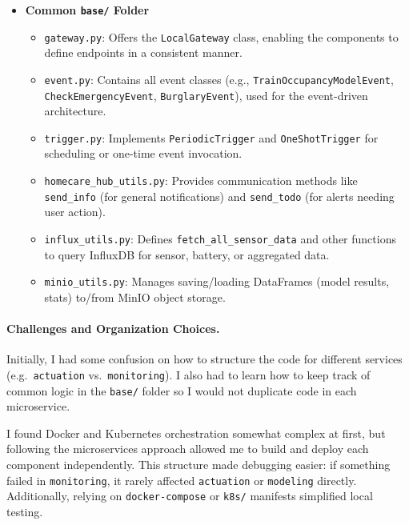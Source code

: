 \documentclass[A4,10pt]{article}
\begin{document}
\begin{itemize}
  \item \textbf{Common \texttt{base/} Folder}
  \begin{itemize}
    \item \texttt{gateway.py}: Offers the \texttt{LocalGateway} class, enabling the components to define 
      endpoints in a consistent manner.
    \item \texttt{event.py}: Contains all event classes (e.g., \texttt{TrainOccupancyModelEvent}, 
      \texttt{CheckEmergencyEvent}, \texttt{BurglaryEvent}), used for the event-driven architecture.
    \item \texttt{trigger.py}: Implements \texttt{PeriodicTrigger} and \texttt{OneShotTrigger} for scheduling 
      or one-time event invocation.
    \item \texttt{homecare\_hub\_utils.py}: Provides communication methods like \texttt{send\_info} 
      (for general notifications) and \texttt{send\_todo} (for alerts needing user action).
    \item \texttt{influx\_utils.py}: Defines \texttt{fetch\_all\_sensor\_data} and other functions to 
      query InfluxDB for sensor, battery, or aggregated data.
    \item \texttt{minio\_utils.py}: Manages saving/loading DataFrames (model results, stats) to/from MinIO object storage.
  \end{itemize}
\end{itemize}

\paragraph{Challenges and Organization Choices.}
Initially, I had some confusion on how to structure the code for different services (e.g.\ 
\texttt{actuation} vs.\ \texttt{monitoring}). I also had to learn how to keep track of
common logic in the \texttt{base/} folder so I would not duplicate code in each microservice. 

I found Docker and Kubernetes orchestration somewhat complex at first, but following 
the microservices approach allowed me to build and deploy each component independently. 
This structure made debugging easier: if something failed in \texttt{monitoring}, it rarely 
affected \texttt{actuation} or \texttt{modeling} directly. Additionally, relying on 
\texttt{docker-compose} or \texttt{k8s/} manifests simplified local testing.
\end{document}
